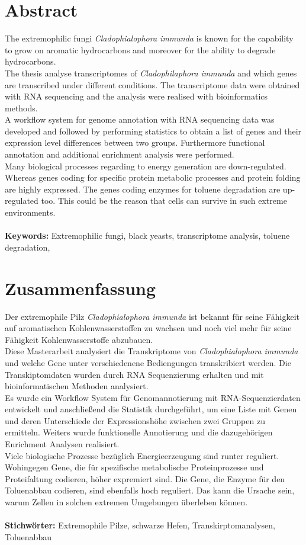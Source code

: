 \documentclass[12pt, a4paper]{report}
\begin{document}
\section*{Abstract}
The extremophilic fungi \textit{Cladophialophora immunda} is known for the capability to grow on aromatic hydrocarbons and moreover for the ability to degrade hydrocarbons.\\
The thesis analyse transcriptomes of \textit{Cladophilaphora immunda} and which genes are transcribed under different conditions. The transcriptome data were obtained with RNA sequencing and the analysis were realised with bioinformatics methods. \\
A workflow system for genome annotation with RNA sequencing data was developed and followed by performing statistics to obtain a list of genes and their expression level differences between two groups. Furthermore functional annotation and additional enrichment analysis were performed.\\
Many biological processes regarding to energy generation are down-regulated. Whereas genes coding for specific protein metabolic processes and protein folding are highly expressed. The genes coding enzymes for toluene degradation are up-regulated too. This could be the reason that cells can survive in such extreme environments. \\
\ \\
\textbf{Keywords:} Extremophilic fungi, black yeasts, transcriptome analysis, toluene degradation, 
\newpage
\section*{Zusammenfassung}
Der extremophile Pilz \textit{Cladophialophora immunda} ist bekannt für seine Fähigkeit auf aromatischen Kohlenwasserstoffen zu wachsen und noch viel mehr für seine Fähigkeit Kohlenwasserstoffe abzubauen. \\
Diese Masterarbeit analysiert die Transkriptome von \textit{Cladophialophora immunda} und welche Gene unter verschiedenene Bediengungen transkribiert werden. Die Transkiptomdaten wurden durch RNA Sequenzierung erhalten und mit bioinformatischen Methoden analysiert. \\
Es wurde ein Workflow System für Genomannotierung mit RNA-Sequenzierdaten entwickelt und anschließend die Statistik durchgeführt, um eine Liste mit Genen und deren Unterschiede der Expressionshöhe zwischen zwei Gruppen zu ermitteln. Weiters wurde funktionelle Annotierung und die dazugehörigen Enrichment Analysen realisiert. \\
Viele biologische Prozesse bezüglich Energieerzeugung sind runter reguliert. Wohingegen Gene, die für spezifische metabolische Proteinprozesse und Proteifaltung codieren, höher expremiert sind. Die Gene, die Enzyme für den Toluenabbau codieren, sind ebenfalls hoch reguliert. Das kann die Ursache sein, warum Zellen in solchen extremen Umgebungen überleben können. \\
\ \\
\textbf{Stichw\"orter:} Extremophile Pilze, schwarze Hefen, Transkirptomanalysen, Toluenabbau 
\newpage
\tableofcontents
\newpage
\setcounter{chapter}{1}
\setcounter{figure}{0}
\end{document}
